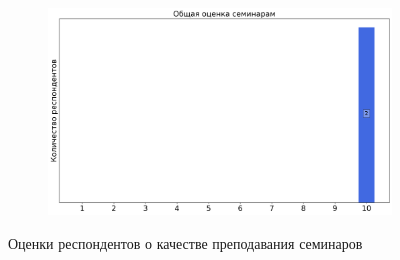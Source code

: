 \begin{figure}[H]
\begin{subfigure}[b]{0.45\textwidth}
			\end{subfigure}
			\begin{subfigure}[b]{0.45\textwidth}
				\centering
				\includegraphics[width=\textwidth]{images/4 course/Квантовая механика/seminarists-marks-Корибут А.В.-3.png}
			\end{subfigure}	
			\caption{Оценки респондентов о качестве преподавания семинаров}
		\end{figure}


